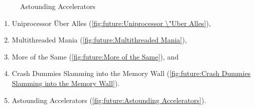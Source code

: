 \begin{figure}
\centering
{}
\caption{Astounding Accelerators}
\end{figure}

\begin{enumerate}
\item	Uniprocessor \"Uber Alles
	(\cref{fig:future:Uniprocessor \"Uber Alles}),
\item	Multithreaded Mania
	(\cref{fig:future:Multithreaded Mania}),
\item	More of the Same
	(\cref{fig:future:More of the Same}), and
\item	Crash Dummies Slamming into the Memory Wall
	(\cref{fig:future:Crash Dummies Slamming into the Memory Wall}).
\item	Astounding Accelerators
	(\cref{fig:future:Astounding Accelerators}).
\end{enumerate}

